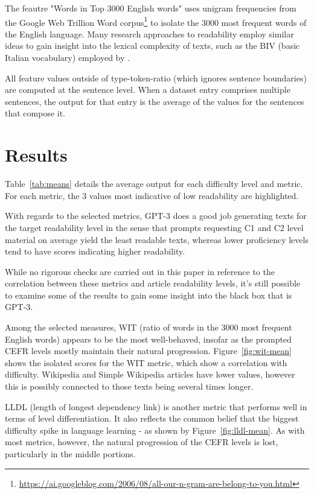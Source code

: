 \documentclass[11pt]{article}
\begin{document}
The feautre "Words in Top 3000 English words" uses unigram frequencies from the Google Web Trillion Word corpus\footnote{\url{https://ai.googleblog.com/2006/08/all-our-n-gram-are-belong-to-you.html}} to isolate the 3000 most frequent words of the English language. Many research approaches to readability employ similar ideas to gain insight into the lexical complexity of texts, such as the BIV (basic Italian vocabulary) employed by \citep{dellorletta-etal-2011-read}.

All feature values outside of type-token-ratio (which ignores sentence boundaries) are computed at the sentence level. When a dataset entry comprises multiple sentences, the output for that entry is the average of the values for the sentences that compose it. 

\section{Results}



Table~\ref{tab:means} details the average output for each difficulty level and metric. For each metric, the 3 values most indicative of low readability are highlighted.

With regards to the selected metrics, GPT-3 does a good job generating texts for the target readability level in the sense that prompts requesting C1 and C2 level material on average yield the least readable texts, whereas lower proficiency levels tend to have scores indicating higher readability.
 
While no rigorous checks are carried out in this paper in reference to the correlation between these metrics and article readability levels, it's still possible to examine some of the results to gain some insight into the black box that is GPT-3.



Among the selected measures, WIT (ratio of words in the 3000 most frequent English words) appears to be the most well-behaved, insofar as the prompted CEFR levels mostly maintain their natural progression. Figure~\ref{fig:wit-mean} shows the isolated scores for the WIT metric, which show a correlation with difficulty. Wikipedia and Simple Wikipedia articles have lower values, however this is possibly connected to those texts being several times longer.



LLDL (length of longest dependency link) is another metric that performs well in terms of level differentiation. It also reflects the common belief that the biggest difficulty spike in language learning - as shown by Figure~\ref{fig:lldl-mean}. As with most metrics, however, the natural progression of the CEFR levels is lost, particularly in the middle portions.
\end{document}
